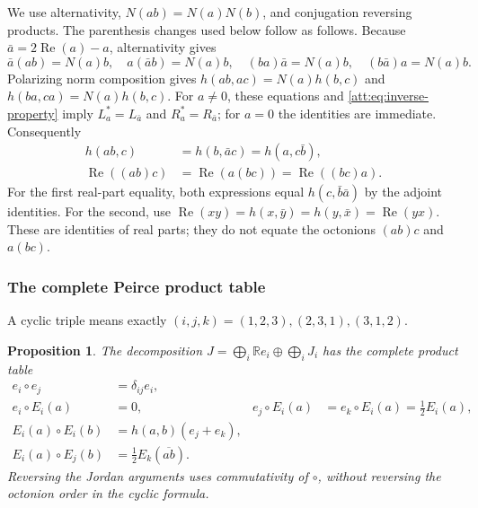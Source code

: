 \documentclass[11pt]{article}
\newtheorem{proposition}[theorem]{Proposition}
\theoremstyle{definition}
\begin{document}
We use alternativity, $N(ab)=N(a)N(b)$, and conjugation reversing
products. The parenthesis changes used below follow as follows.
Because $\bar a=2\operatorname{Re}(a)-a$, alternativity gives
\begin{equation}
 \bar a(ab)=N(a)b,\quad a(\bar a b)=N(a)b,\quad
 (ba)\bar a=N(a)b,\quad (b\bar a)a=N(a)b.
 \label{att:eq:inverse-property}
\end{equation}
Polarizing norm composition gives
$h(ab,ac)=N(a)h(b,c)$ and $h(ba,ca)=N(a)h(b,c)$.
For $a\ne0$, these equations and \eqref{att:eq:inverse-property}
imply $L_a^*=L_{\bar a}$ and $R_a^*=R_{\bar a}$; for $a=0$
the identities are immediate. Consequently
\begin{align}
 h(ab,c)&=h(b,\bar a c)=h(a,c\bar b),\nonumber\\
 \operatorname{Re}((ab)c)&=\operatorname{Re}(a(bc))
                         =\operatorname{Re}((bc)a).
 \label{att:eq:real-associativity}
\end{align}
For the first real-part equality, both expressions equal
$h(c,\bar b\bar a)$ by the adjoint identities. For the second, use
$\operatorname{Re}(xy)=h(x,\bar y)=h(y,\bar x)=\operatorname{Re}(yx)$.
These are identities of real parts; they do not equate the octonions
$(ab)c$ and $a(bc)$.

\subsubsection{The complete Peirce product table}

A cyclic triple means exactly $(i,j,k)=(1,2,3),(2,3,1),(3,1,2)$.

\begin{proposition}\label{att:prop:peirce}
The decomposition $J=\bigoplus_i\mathbb R e_i\oplus\bigoplus_iJ_i$
has the complete product table
\begin{align}
 e_i\circ e_j&=\delta_{ij}e_i,\nonumber\\
 e_i\circ E_i(a)&=0,&
 e_j\circ E_i(a)&=e_k\circ E_i(a)=\tfrac12E_i(a),\nonumber\\
 E_i(a)\circ E_i(b)&=h(a,b)(e_j+e_k),\label{att:eq:peirce-table}\\
 E_i(a)\circ E_j(b)&=\tfrac12E_k(\overline{ab}).\nonumber
\end{align}
Reversing the Jordan arguments uses commutativity of $\circ$,
without reversing the octonion order in the cyclic formula.
\end{proposition}
\end{document}
